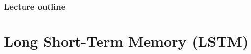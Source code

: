 
 







\begin{frame}
\frametitle{Lecture outline}
\tableofcontents
\end{frame}




\section{Long Short-Term Memory (LSTM)}

